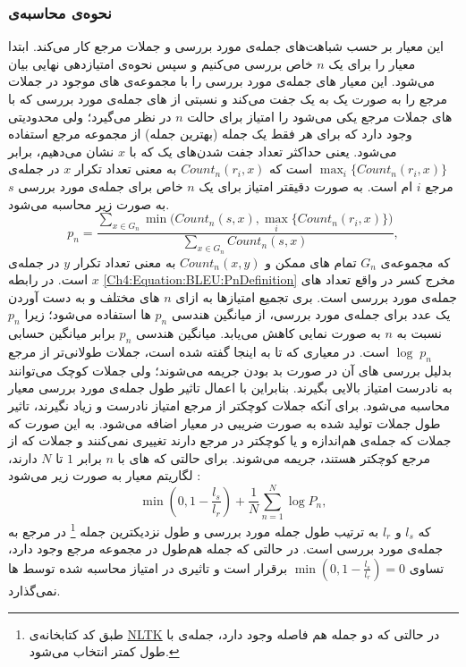 \subsubsection{نحوه‌ی محاسبه‌ی }
این معیار بر حسب شباهت‌های
\ngram{}
جمله‌ی مورد بررسی و جملات مرجع کار می‌کند. ابتدا معیار را برای یک $n$ خاص بررسی می‌کنیم و سپس نحوه‌ی امتیازدهی نهایی بیان می‌شود.
\newline
 این معیار
\ngram
های جمله‌ی مورد بررسی را با مجموعه‌ی
\ngram
های موجود در جملات مرجع را به صورت یک به یک جفت می‌کند و نسبتی از
\ngram
های جمله‌ی مورد بررسی که با 
\ngram
های جملات مرجع یکی می‌شود را امتیاز برای حالت $n$ در نظر می‌گیرد؛
 ولی محدودیتی وجود دارد که برای هر
\ngram{}
فقط یک جمله (بهترین جمله) از مجموعه مرجع استفاده می‌شود. یعنی حداکثر تعداد جفت شدن‌های یک
\ngram{}
که با $x$ نشان می‌دهیم، برابر
$ \displaystyle \max_i \{Count_n(r_i,x)\}$
است که
$Count_n(r_i,x)$
به معنی تعداد تکرار 
\ngram{}
$x$
در  جمله‌ی مرجع $i$ ام است.
به صورت دقیقتر امتیاز برای یک $n$ خاص برای جمله‌ی مورد بررسی $s$ به صورت زیر محاسبه می‌شود.
\begin{equation}\label{Ch4:Equation:BLEU:PnDefinition}
p_n = \frac
{\sum_{x \in G_n} \min\Big(Count_n(s,x),\max\limits_{i} \{Count_n(r_i,x)\}\Big)}
{\sum_{x \in G_n} Count_n(s,x)},
\end{equation}
که مجموعه‌ی
 $G_n$
تمام
\ngram های
ممکن و
$Count_n(x,y)$
به معنی تعداد تکرار 
\ngram{}
$y$
در جمله‌ی $x$  است.
در رابطه
\ref{Ch4:Equation:BLEU:PnDefinition}
مخرج کسر در واقع تعداد
\ngram
های جمله‌ی مورد بررسی است.
\newline
بری تجمیع امتیازها به ازای $n$ های مختلف و به دست آوردن یک عدد برای جمله‌ی مورد بررسی، از میانگین هندسی $p_n$ ها استفاده می‌شود؛ زیرا $p_n$ نسبت به $n$ به صورت نمایی کاهش می‌یابد. میانگین هندسی $p_n$ برابر میانگین حسابی
$\log \; p_n$
است.
\newline
در معیاری که تا به اینجا گفته شده است،
جملات طولانی‌تر از مرجع بدلیل بررسی 
\ngram
های آن در صورت بد بودن جریمه می‌شوند؛ ولی جملات کوچک می‌توانند به نادرست امتیاز بالایی بگیرند. بنابراین با اعمال تاثیر طول جمله‌ی مورد بررسی معیار
 محاسبه می‌شود.
برای آنکه جملات کوچکتر از مرجع  امتیاز نادرست و زیاد نگیرند، تاثیر طول جملات تولید شده به صورت ضریبی در معیار اضافه می‌شود. به این صورت که جملات که جمله‌ی هم‌اندازه‌ و یا کوچکتر در مرجع دارند تغییری نمی‌کنند و جملات که از مرجع کوچکتر هستند، جریمه می‌شوند.
 برای حالتی که
\ngram
های با  $n$ برابر $1$ تا $N$ دارند، لگاریتم معیار
به صورت زیر می‌شود
\cite{papineni2002bleu}:
\begin{equation}
\min(0, 1 - \frac{l_s}{l_r}) + \frac{1}{N} \sum_{n=1}^{N} \log P_n ,
\end{equation}
که 
$l_s$ 
و
$l_r$
به ترتیب طول جمله مورد بررسی و طول نزدیکترین جمله 
\footnote{طبق کد کتابخانه‌ی 
	\href{https://www.nltk.org/_modules/nltk/translate/bleu_score.html}{NLTK}
	در حالتی که دو جمله هم فاصله وجود دارد، جمله‌ی با طول کمتر انتخاب می‌شود.
	}
در مرجع به جمله‌ی مورد بررسی است. در حالتی که جمله هم‌طول در مجموعه مرجع وجود دارد، تساوی
$\min(0, 1 - \frac{l_s}{l_r}) = 0 $
برقرار است و تاثیری در امتیاز محاسبه شده توسط
\ngram
ها نمی‌گذارد. 
